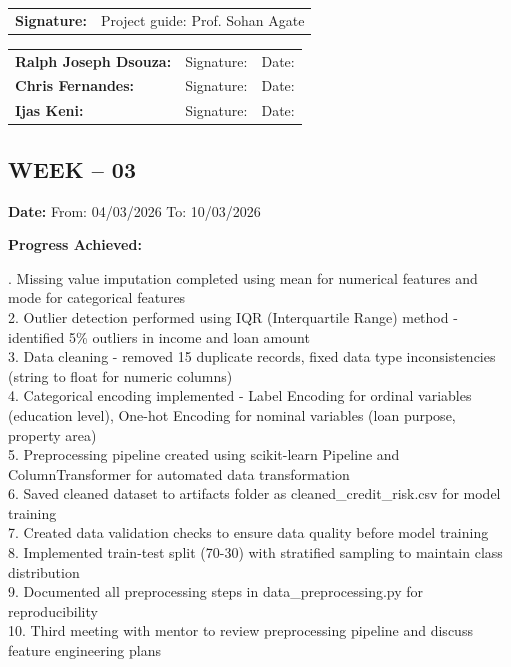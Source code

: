 \documentclass[12pt,a4paper]{article}
\begin{document}
\medskip

\noindent\begin{tabular}{p{4cm} p{6cm}}
\textbf{Signature:} & Project guide: Prof. Sohan Agate \\
\end{tabular}

\medskip

\noindent\begin{tabular}{p{3.5cm} p{5cm} p{3cm}}
\textbf{Ralph Joseph Dsouza:} & Signature: \underline{\hspace{4cm}} & Date: \underline{\hspace{2cm}} \\
\textbf{Chris Fernandes:} & Signature: \underline{\hspace{4cm}} & Date: \underline{\hspace{2cm}} \\
\textbf{Ijas Keni:} & Signature: \underline{\hspace{4cm}} & Date: \underline{\hspace{2cm}} \\
\end{tabular}

\newpage

\subsection*{WEEK – 03}
\vspace{0.3cm}

\textbf{Date:} From: 04/03/2026 To: 10/03/2026

\medskip

\noindent\textbf{Progress Achieved:}

\medskip

. Missing value imputation completed using mean for numerical features and mode for categorical features \\
2. Outlier detection performed using IQR (Interquartile Range) method - identified 5\% outliers in income and loan amount \\
3. Data cleaning - removed 15 duplicate records, fixed data type inconsistencies (string to float for numeric columns) \\
4. Categorical encoding implemented - Label Encoding for ordinal variables (education level), One-hot Encoding for nominal variables (loan purpose, property area) \\
5. Preprocessing pipeline created using scikit-learn Pipeline and ColumnTransformer for automated data transformation \\
6. Saved cleaned dataset to artifacts folder as cleaned\_credit\_risk.csv for model training \\
7. Created data validation checks to ensure data quality before model training \\
8. Implemented train-test split (70-30) with stratified sampling to maintain class distribution \\
9. Documented all preprocessing steps in data\_preprocessing.py for reproducibility \\
10. Third meeting with mentor to review preprocessing pipeline and discuss feature engineering plans
\end{document}
